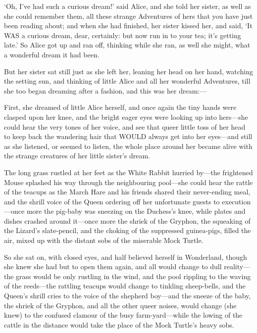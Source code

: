 \documentclass[12pt]{book}
\begin{document}
\begin{Parallel}[p]{}{}
{‘Oh, I’ve had such a curious dream!’ said Alice, and she told her sister, as well as she could remember them, all these strange Adventures of hers that you have just been reading about; and when she had finished, her sister kissed her, and said, ‘It WAS a curious dream, dear, certainly: but now run in to your tea; it’s getting late.’ So Alice got up and ran off, thinking while she ran, as well she might, what a wonderful dream it had been.

But her sister sat still just as she left her, leaning her head on her hand, watching the setting sun, and thinking of little Alice and all her wonderful Adventures, till she too began dreaming after a fashion, and this was her dream:—

First, she dreamed of little Alice herself, and once again the tiny hands were clasped upon her knee, and the bright eager eyes were looking up into hers—she could hear the very tones of her voice, and see that queer little toss of her head to keep back the wandering hair that WOULD always get into her eyes—and still as she listened, or seemed to listen, the whole place around her became alive with the strange creatures of her little sister’s dream.

The long grass rustled at her feet as the White Rabbit hurried by—the frightened Mouse splashed his way through the neighbouring pool—she could hear the rattle of the teacups as the March Hare and his friends shared their never-ending meal, and the shrill voice of the Queen ordering off her unfortunate guests to execution—once more the pig-baby was sneezing on the Duchess’s knee, while plates and dishes crashed around it—once more the shriek of the Gryphon, the squeaking of the Lizard’s slate-pencil, and the choking of the suppressed guinea-pigs, filled the air, mixed up with the distant sobs of the miserable Mock Turtle.

So she sat on, with closed eyes, and half believed herself in Wonderland, though she knew she had but to open them again, and all would change to dull reality—the grass would be only rustling in the wind, and the pool rippling to the waving of the reeds—the rattling teacups would change to tinkling sheep-bells, and the Queen’s shrill cries to the voice of the shepherd boy—and the sneeze of the baby, the shriek of the Gryphon, and all the other queer noises, would change (she knew) to the confused clamour of the busy farm-yard—while the lowing of the cattle in the distance would take the place of the Mock Turtle’s heavy sobs.

}
\end{Parallel}
\end{document}
